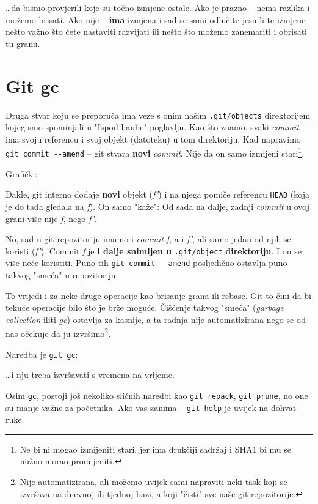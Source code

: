 \dots{}da bismo provjerili koje su točno izmjene ostale.
Ako je prazno -- nema razlika i možemo brisati.
Ako nije -- \textbf{ima} izmjena i sad se sami odlučite jesu li te izmjene nešto važno što ćete nastaviti razvijati ili nešto što možemo zanemariti i obrisati tu granu.

\section*{Git gc}

Druga stvar koju se preporuča ima veze s onim našim \verb+.git/objects+ direktorijem kojeg smo spominjali u "Ispod haube" poglavlju.
Kao što znamo, svaki \emph{commit} ima svoju referencu i svoj objekt (datoteku) u tom direktoriju.
Kad napravimo \verb+git commit --amend+ -- git stvara \textbf{novi} \emph{commit}.
Nije da on samo izmijeni stari\footnote{Ne bi ni mogao izmijeniti stari, jer ima drukčiji sadržaj i SHA1 bi mu se nužno morao promijeniti.}.

Grafički:



Dakle, git interno dodaje \textbf{novi} objekt (\emph{f'}) i na njega pomiče referencu \verb+HEAD+ (koja je do tada gledala na \emph f).
On samo "kaže": Od sada na dalje, zadnji \emph{commit} u ovoj grani više nije \emph f, nego \emph{f'}.

No, sad u git repozitoriju imamo i \emph{commit} \emph f, a i \emph{f'}, ali samo jedan od njih se koristi (\emph{f'}).
Commit \emph f je \textbf{i dalje snimljen u} \verb+.git/object+ \textbf{direktoriju}.
I on se više neće koristiti.
Puno tih \verb+git commit --amend+ posljedično ostavlja puno takvog "smeća" u repozitoriju.

To vrijedi i za neke druge operacije kao brisanje grana ili rebase.
Git to čini da bi tekuće operacije bilo što je brže moguće.
Čišćenje takvog "smeća" (\emph{garbage collection} iliti \emph{gc}) ostavlja za kasnije, a ta radnja nije automatizirana nego se od nas očekuje da ju izvršimo\footnote{Nije automatizirana, ali možemo uvijek sami napraviti neki task koji se izvršava na dnevnoj ili tjednoj bazi, a koji "čisti" sve naše git repozitorije.}.

Naredba je \verb+git gc+:



\dots{}i nju treba izvršavati s vremena na vrijeme.

Osim \verb+gc+, postoji još nekoliko sličnih naredbi kao \verb+git repack+, \verb+git prune+, no one su manje važne za početnika.
Ako vas zanima -- \verb+git help+ je uvijek na dohvat ruke.

